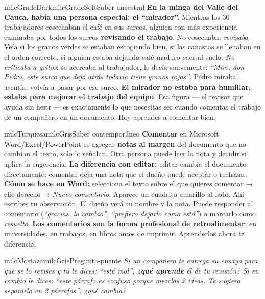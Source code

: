 \documentclass[11pt,letterpaper]{article}
\begin{document}
\begin{softbox}{milcGradeDark}{milcGradeSoft}{Saber ancestral}
\textbf{En la minga del Valle del Cauca, había una persona especial: el ``mirador''.} Mientras los 30 trabajadores cosechaban el café en sus surcos, alguien con más experiencia caminaba por todos los surcos \textbf{revisando el trabajo}. No cosechaba: \emph{revisaba}. Veía si los granos verdes se estaban escogiendo bien, si las canastas se llenaban en el orden correcto, si alguien estaba dejando café maduro caer al suelo. \emph{No criticaba a gritos}: se acercaba al trabajador, le decía suavemente: \emph{``Mire, don Pedro, este surco que dejó atrás todavía tiene granos rojos''}. Pedro miraba, asentía, volvía a pasar por ese surco. \textbf{El mirador no estaba para humillar, estaba para mejorar el trabajo del equipo}. Esa figura --- el revisor que ayuda sin herir --- es exactamente lo que necesitas ser cuando comentas el trabajo de un compañero en un documento. Hoy aprendes a comentar bien.
\end{softbox}

\begin{softbox}{milcTurquesa}{milcGris}{Saber contemporáneo}
\textbf{Comentar} en Microsoft Word/Excel/PowerPoint es agregar \textbf{notas al margen} del documento que no cambian el texto, solo lo señalan. Otra persona puede leer la nota y decidir si aplica la sugerencia. \textbf{La diferencia con editar:} editar cambia el documento directamente; comentar deja una nota que el dueño puede aceptar o rechazar. \textbf{Cómo se hace en Word:} selecciona el texto sobre el que quieres comentar → clic derecho → \emph{Nuevo comentario}. Aparece un cuadrito amarillo al lado. Ahí escribes tu observación. El dueño verá tu nombre y la nota. Puede responder al comentario (\emph{``gracias, lo cambio''}, \emph{``prefiero dejarlo como está''}) o marcarlo como \emph{resuelto}. \textbf{Los comentarios son la forma profesional de retroalimentar}: en universidades, en trabajos, en libros antes de imprimir. Aprenderlos ahora te diferencia.
\end{softbox}

\begin{softbox}{milcMostaza}{milcGris}{Pregunta-puente}
\textit{Si un compañero te entrega su ensayo para que se lo revises y tú le dices: \emph{``está mal''}, ¿\textbf{qué aprende} él de tu revisión? Si en cambio le dices: \emph{``este párrafo es confuso porque mezclas 2 ideas. Te sugiero separarlo en 2 párrafos''}, ¿qué cambia?}
\end{softbox}
\end{document}
